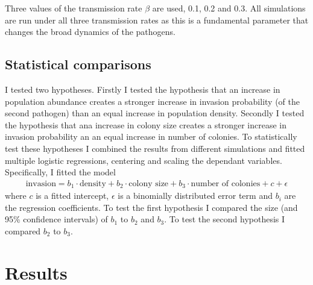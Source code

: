 Three values of the transmission rate $\beta$ are used, 0.1, 0.2 and 0.3.
All simulations are run under all three transmission rates as this is a fundamental parameter that changes the broad dynamics of the pathogens.


\subsection{Statistical comparisons}

I tested two hypotheses.
Firstly I tested the hypothesis that an increase in population abundance creates a stronger increase in invasion probability (of the second pathogen) than an equal increase in population density.
Secondly I tested the hypothesis that ana increase in colony size creates a stronger increase in invasion probability an an equal increase in number of colonies.
To statistically test these hypotheses I combined the results from different simulations and fitted multiple logistic regressions, centering and scaling the dependant variables.
Specifically, I fitted the model 
\begin{align}
\text{invasion} = b_1\cdot \text{density} + b_2\cdot  \text{colony size} + b_3\cdot  \text{number of colonies} + c + \epsilon
\end{align}
 where $c$ is a fitted intercept, $\epsilon$ is a binomially distributed error term and $b_i$ are the regression coefficients.
To test the first hypothesis I compared the size (and 95\% confidence intervals) of $b_1$ to $b_2$ and $b_3$.
To test the second hypothesis I compared $b_2$ to $b_3$.










\section{Results}























